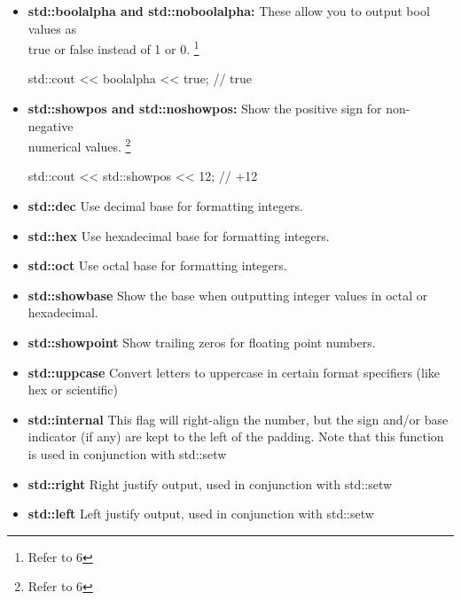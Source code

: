 \documentclass{report}
\begin{document}
\begin{itemize}
        \item \textbf{std::boolalpha and std::noboolalpha:} These allow you to output bool values as \\ true or false instead of 1 or 0. \footnote{Refer to 6}
            \smallbreak
            
            \begin{cppcode}
            std::cout << boolalpha << true; // true
            \end{cppcode}
            
        \item \textbf{std::showpos and std::noshowpos:} Show the positive sign for non-negative \\ numerical values. \footnote{Refer to 6}
            \smallbreak
            
            \begin{cppcode}
            std::cout << std::showpos << 12; // +12
            \end{cppcode}
            
        \item \textbf{std::dec} Use decimal base for formatting integers.
        \item \textbf{std::hex} Use hexadecimal base for formatting integers.
        \item \textbf{std::oct} Use octal base for formatting integers.
        \item \textbf{std::showbase}  Show the base when outputting integer values in octal or hexadecimal.
        \item \textbf{std::showpoint} Show trailing zeros for floating point numbers.
        \item \textbf{std::uppcase} Convert letters to uppercase in certain format specifiers (like hex or scientific)
        \item \textbf{std::internal} This flag will right-align the number, but the sign and/or base indicator (if any) are kept to the left of the padding. Note that this function is used in conjunction with std::setw
        \item \textbf{std::right} Right justify output, used in conjunction with std::setw
        \item \textbf{std::left} Left justify output, used in conjunction with std::setw
    \end{itemize}
\end{document}
